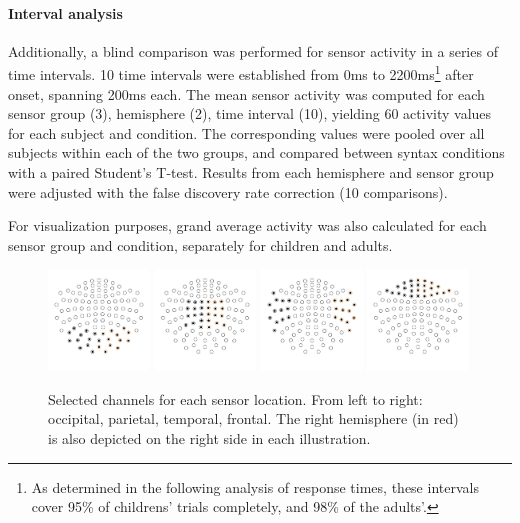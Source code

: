 \paragraph{Interval analysis}
Additionally, a blind comparison was performed for sensor activity in a series of time intervals.
10 time intervals were established from 0ms to 2200ms\footnote{As determined in the following analysis of response times, these intervals cover 95\% of childrens' trials completely, and 98\% of the adults'.} after onset, spanning 200ms each.
The mean sensor activity was computed for each sensor group (3), hemisphere (2), time interval (10), yielding 60 activity values for each subject and condition.
The corresponding values were pooled over all subjects within each of the two groups, and compared between syntax conditions with a paired Student's T-test.
Results from each hemisphere and sensor group were adjusted with the false discovery rate correction (10 comparisons).

For visualization purposes, grand average activity was also calculated for each sensor group and condition, separately for children and adults.

\begin{figure}[h]
\begin{center}
\vspace{7mm}
\includegraphics[width=0.24\textwidth]{pics/3_3_occipital_sensors}
\includegraphics[width=0.24\textwidth]{pics/3_3_parietal_sensors}
\includegraphics[width=0.24\textwidth]{pics/3_3_temporal_sensors}
\includegraphics[width=0.24\textwidth]{pics/3_3_frontal_sensors}
\caption{\label{3.3.sensors} Selected channels for each sensor location. From left to right: occipital, parietal, temporal, frontal. The right hemisphere (in red) is also depicted on the right side in each illustration.}
\end{center}
\end{figure}


